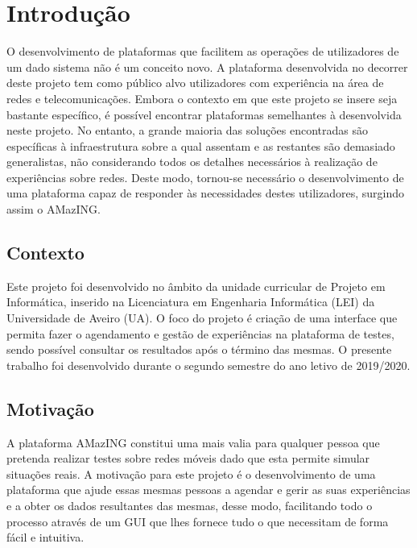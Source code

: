\chapter{Introdução}
\label{chp:introduction}
O desenvolvimento de plataformas que facilitem as operações de utilizadores de um dado sistema não é um conceito novo.  A plataforma desenvolvida no decorrer deste projeto tem como público alvo utilizadores com experiência na área de redes e telecomunicações. \newline
Embora o contexto em que este projeto se insere seja bastante específico, é possível encontrar plataformas semelhantes à desenvolvida neste projeto. No entanto, a grande maioria das soluções encontradas são específicas à infraestrutura sobre a qual assentam e as restantes são demasiado generalistas, não considerando todos os detalhes necessários à realização de experiências sobre redes. \newline
Deste modo, tornou-se necessário o desenvolvimento de uma plataforma capaz de responder às necessidades destes utilizadores, surgindo assim o AMazING.

\section{Contexto}
Este projeto foi desenvolvido no âmbito da unidade curricular de Projeto em Informática, inserido na Licenciatura em Engenharia Informática (LEI) da Universidade de Aveiro (UA). O foco do projeto é criação de uma interface que permita fazer o agendamento e gestão de experiências na plataforma de testes, sendo possível consultar os resultados após o término das mesmas. O presente trabalho foi desenvolvido durante o segundo semestre do ano letivo de 2019/2020.

\section{Motivação}
A plataforma AMazING constitui uma mais valia para qualquer pessoa que pretenda realizar testes sobre redes móveis dado que esta permite simular situações reais.\newline
A motivação para este projeto é o desenvolvimento de uma plataforma que ajude essas mesmas pessoas a agendar e gerir as suas experiências e a obter os dados resultantes das mesmas, desse modo, facilitando todo o processo através de um GUI que lhes fornece tudo o que necessitam de forma fácil e intuitiva.

